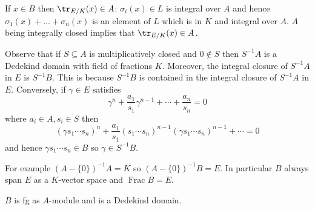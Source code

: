 \documentclass[a4paper]{article}
\DeclareMathOperator{\Frac}{Frac}
\begin{document}
\begin{remark}
  If \(x \in B\) then \(\tr_{E/K}(x) \in A\): \(\sigma_i(x) \in L\) is integral over \(A\) and hence \(\sigma_1(x) + \dots + \sigma_n(x)\) is an element of \(L\) which is in \(K\) and integral over \(A\). \(A\) being integrally closed implies that \(\tr_{E/K}(x) \in A\).
\end{remark}

Observe that if \(S \subseteq A\) is multiplicatively closed and \(0 \notin S\) then \(S^{-1}A\) is a Dedekind domain with field of fractions \(K\). Moreover, the integral closure of \(S^{-1}A\) in \(E\) is \(S^{-1}B\). This is because \(S^{-1}B\) is contained in the integral closure of \(S^{-1}A\) in \(E\). Conversely, if \(\gamma \in E\) satisfies
\[
  \gamma^n + \frac{a_1}{s_1} \gamma^{n - 1} + \cdots + \frac{a_n}{s_n} = 0
\]
where \(a_i \in A, s_i \in S\) then
\[
  (\gamma s_1 \cdots s_n)^n + \frac{a_1}{s_1} (s_1 \cdots s_n)^{n - 1} (\gamma s_1 \cdots s_n)^{n - 1} + \cdots = 0
\]
and hence \(\gamma s_1 \cdots s_n \in B\) so \(\gamma \in S^{-1}B\).

For example \((A - \{0\})^{-1} A = K\) so \((A - \{0\})^{-1}B = E\). In particular \(B\) always span \(E\) as a \(K\)-vector space and \(\Frac B = E\).

\begin{proposition}
  \(B\) is fg as \(A\)-module and is a Dedekind domain.
\end{proposition}
\end{document}
